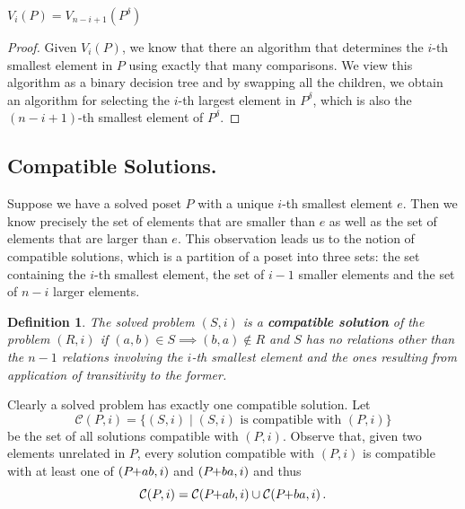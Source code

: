 \documentclass[twoside,leqno,twocolumn]{article}
\newcommand{\pchild}[3]{{#1}\kern-1pt{+}{#2}{#3}}
\newcommand{\dual}[1]{{#1}^{\delta}}
\newtheorem{definition}{Definition}[section]
\begin{document}
\begin{lemma} \label{lemma:dual_poset_allowed}
  $V_i(P) = V_{n - i + 1}(\dual{P})$
\end{lemma}

\begin{proof}
  Given $V_i(P)$, we know that there an algorithm that determines the $i$-th smallest element in $P$ using exactly that many comparisons.
  We view this algorithm as a binary decision tree and by swapping all the children, we obtain an algorithm for selecting the $i$-th largest element in $\dual{P}$, which is also the $(n - i + 1)$-th smallest element of $\dual{P}$.
\end{proof}

\subsection{Compatible Solutions.}
Suppose we have a solved poset $P$ with a unique $i$-th smallest element $e$.
Then we know precisely the set of elements that are smaller than $e$ as well as the set of elements that are larger than $e$.
This observation leads us to the notion of compatible solutions, which is a partition of a poset into three sets: the set containing the $i$-th smallest element, the set of $i - 1$ smaller elements and the set of $n - i$ larger elements.

\begin{definition}%
  The solved problem $(S, i)$ is a \textbf{compatible solution} of the problem $(R, i)$ if $(a, b)\in S\implies (b, a)\notin R$ and $S$ has no relations other than the $n - 1$ relations involving the $i$-th smallest element and the ones resulting from application of transitivity to the former.
\end{definition}

Clearly a solved problem has exactly one compatible solution.
Let
\begin{equation*}
  \mathcal{C}(P, i) = \{(S, i) \mid (S, i) \text{ is compatible with } (P, i) \}
\end{equation*}
be the set of all solutions compatible with $(P, i)$.
Observe that, given two elements unrelated in $P$, every solution compatible with $(P, i)$ is compatible with at least one of $(\pchild{P}{a}{b}, i)$ and $(\pchild{P}{b}{a}, i)$ and thus
\begin{equation}\label{lemma:compatible_union}
  \mathcal{C}(P, i) = \mathcal{C}(\pchild{P}{a}{b}, i) \cup \mathcal{C}(\pchild{P}{b}{a}, i)\,\text{.}
\end{equation}
\end{document}
